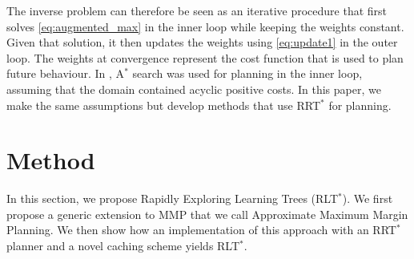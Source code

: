 \documentclass{article}  %
\begin{document}
The inverse problem can therefore be seen as an iterative procedure that first solves \eqref{eq:augmented_max} in the inner loop while keeping the weights constant. Given that solution, it then updates the weights using \eqref{eq:update1} in the outer loop. The weights at convergence represent the cost function that is used to plan future behaviour. In \cite{ratliff2006maximum}, A$^*$ search was used for planning in the inner loop, assuming that the domain contained acyclic positive costs. In this paper, we make the same assumptions but develop methods that use RRT$^*$ for planning.

\section{Method}
	In this section, we propose Rapidly Exploring Learning Trees (RLT$^*$).  We first propose a generic extension to MMP that we call Approximate Maximum Margin Planning.  We then show how an implementation of this approach with an RRT$^*$ planner and a novel caching scheme yields RLT$^*$.

\end{document}
